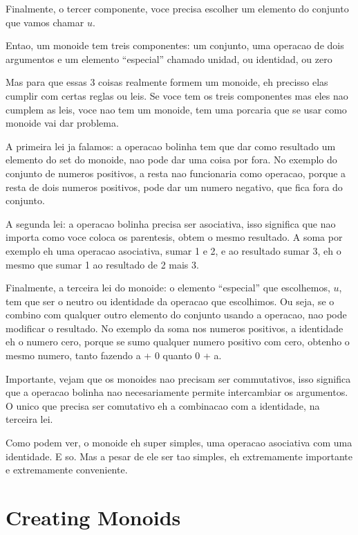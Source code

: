 \documentclass{beamer}
\begin{document}
\begin{frame}
{    Finalmente, o tercer componente, voce precisa escolher um elemento do conjunto
    que vamos chamar \(u\).

    Entao, um monoide tem treis componentes: um conjunto, uma operacao de dois
    argumentos e um elemento ``especial'' chamado unidad, ou identidad, ou zero

    \hrulefill

    Mas para que essas 3 coisas realmente formem um monoide, eh precisso
    elas  cumplir com certas reglas ou leis. Se voce tem os treis componentes
    mas eles nao cumplem as leis, voce nao tem um monoide, tem uma porcaria que
    se usar como monoide vai dar problema.

    A primeira lei ja falamos: a operacao bolinha tem que dar como resultado um
    elemento do set do monoide, nao pode dar uma coisa por fora. No exemplo do conjunto
    de numeros positivos, a resta nao funcionaria como operacao, porque a resta
    de dois numeros positivos, pode dar um numero negativo, que fica fora do conjunto.

    A segunda lei: a operacao bolinha precisa ser asociativa, isso significa que
    nao importa como voce coloca os parentesis, obtem o mesmo resultado. A soma
    por exemplo eh uma operacao asociativa, sumar 1 e 2, e ao resultado sumar 3,
    eh o mesmo que sumar 1 ao resultado de 2 mais 3.

    Finalmente, a terceira lei do monoide: o elemento ``especial'' que
    escolhemos, \(u\), tem que ser o neutro ou identidade da operacao que
    escolhimos. Ou seja, se o combino com qualquer outro elemento do conjunto usando
    a operacao, nao pode modificar o resultado. No exemplo da soma nos numeros positivos, a identidade
    eh o numero cero, porque se sumo qualquer numero positivo com cero, obtenho
    o mesmo numero, tanto fazendo a + 0 quanto 0 + a.

    Importante, vejam que os monoides nao precisam ser commutativos, isso
    significa que a operacao bolinha nao necesariamente permite intercambiar os
    argumentos. O unico que precisa ser comutativo eh a combinacao com a
    identidade, na terceira lei.

    Como podem ver, o monoide eh super simples, uma operacao asociativa com uma
    identidade. E so. Mas a pesar de ele ser tao simples, eh extremamente
    importante e extremamente conveniente.
  }
\end{frame}


\section{Creating Monoids}
\end{document}
